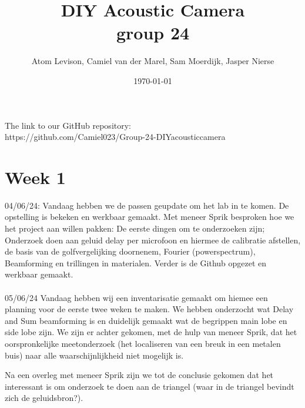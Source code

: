 \documentclass{article}
\title{%
  DIY Acoustic Camera \\
  \Minutes group 24 }
\author{Atom Levison, Camiel van der Marel, Sam Moerdijk, Jasper Nierse}
\date{\today}
\begin{document}
\maketitle

The link to our GitHub repository: \\ https://github.com/Camiel023/Group-24-DIYacousticcamera

\section{Week 1}
04/06/24:
Vandaag hebben we de passen geupdate om het lab in te komen. 
De opstelling is bekeken en werkbaar gemaakt.
Met meneer Sprik besproken hoe we het project aan willen pakken: De eerste dingen om te onderzoeken zijn; Onderzoek doen aan geluid delay per microfoon en hiermee de
calibratie afstellen, de basis van de golfvergelijking doornenem, Fourier (powerspectrum), Beamforming en trillingen in materialen.
Verder is de Github opgezet en werkbaar gemaakt.\\
\\
05/06/24
Vandaag hebben wij een inventarisatie gemaakt om hiemee een planning voor de eerste twee weken te maken.
We hebben onderzocht wat Delay and Sum beamforming is en duidelijk gemaakt wat de begrippen main lobe en side lobe zijn. 
We zijn er achter gekomen, met de hulp van meneer Sprik, dat het oorspronkelijke meetonderzoek (het localiseren van een breuk in een metalen buis) naar alle waarschijnlijkheid niet mogelijk is. 

Na een overleg met meneer Sprik zijn we tot de conclusie gekomen dat het interessant is om onderzoek te doen aan de triangel (waar in de triangel bevindt zich de geluidsbron?).
\end{document}
